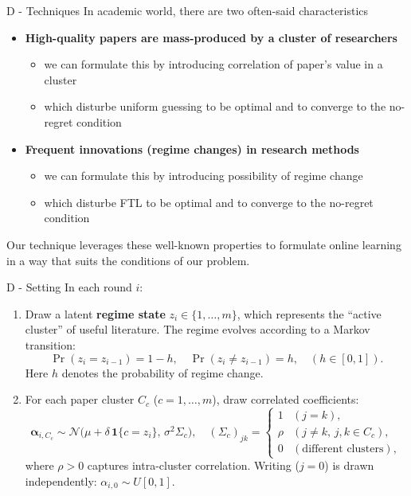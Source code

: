 \documentclass{beamer}
\begin{document}
\begin{frame}{D - Techniques}
    In academic world, there are two often-said characteristics
    \begin{itemize}
        \item \textbf{High-quality papers are mass-produced by a cluster of researchers}
        \begin{itemize}
            \item we can formulate this by introducing correlation of paper's value in a cluster
            \item which disturbe uniform guessing to be optimal and to converge to the no-regret condition
        \end{itemize}
        \item \textbf{Frequent innovations (regime changes) in research methods}
        \begin{itemize}
            \item we can formulate this by introducing possibility of regime change 
            \item which disturbe FTL to be optimal and to converge to the no-regret condition
        \end{itemize}
    \end{itemize}
    Our technique leverages these well-known properties to formulate online learning in a way that suits the conditions of our problem.
\end{frame}

\begin{frame}{D - Setting}
In each round $i$:
\begin{enumerate}
    \item Draw a latent \textbf{regime state} $z_i \in \{1, \dots, m\}$,
          which represents the ``active cluster'' of useful literature.
          The regime evolves according to a Markov transition:
          \[
          \Pr(z_i = z_{i-1}) = 1-h, \quad
          \Pr(z_i \neq z_{i-1}) = h, \quad (h \in [0,1]).
          \]
          Here $h$ denotes the probability of regime change.
    \item For each paper cluster $C_c$ ($c=1,\dots,m$), draw correlated coefficients:
          \[
          \boldsymbol{\alpha}_{i,C_c} \sim 
          \mathcal{N}\!\big(
            \mu + \delta\,\mathbf{1}\{c = z_i\},\,
            \sigma^2 \Sigma_c
          \big), \quad
          (\Sigma_c)_{jk} =
          \begin{cases}
              1 & (j=k),\\
              \rho & (j \neq k,\, j,k \in C_c),\\
              0 & (\text{different clusters}),
          \end{cases}
          \]
          where $\rho>0$ captures intra-cluster correlation.
          Writing ($j=0$) is drawn independently: $\alpha_{i,0} \sim U[0,1]$.
\end{enumerate}
\end{frame}
\end{document}
